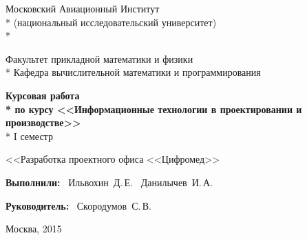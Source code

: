 \begin{titlepage}

\newpage

\begin{center}
Московский Авиационный Институт \\*
(национальный исследовательский университет) \\*

\vspace{2em}

Факультет прикладной математики и физики \\*
Кафедра вычислительной математики и программирования

\vspace{10em}

\Large \textbf{Курсовая работа \\*
по курсу <<Информационные технологии в проектировании и производстве>>} \\*
I семестр

\vspace{3em}

<<Разработка проектного офиса <<Цифромед>>
\end{center}

\vspace{8em}

\hspace{25em}\vbox{
  \hbox{\bfseries{Выполнили:}}
  \hbox{\hspace{1em} Ильвохин Д.\,Е.}
  \hbox{\hspace{1em} Данилычев И.\,А.}
}

\vspace{2em}

\hspace{25em}\vbox{
  \hbox{\bfseries{Руководитель:}}
  \hbox{\hspace{1em} Скородумов С.\,В.}
}

\vspace{\fill}

\begin{center}
Москва, 2015
\end{center}

\end{titlepage}
